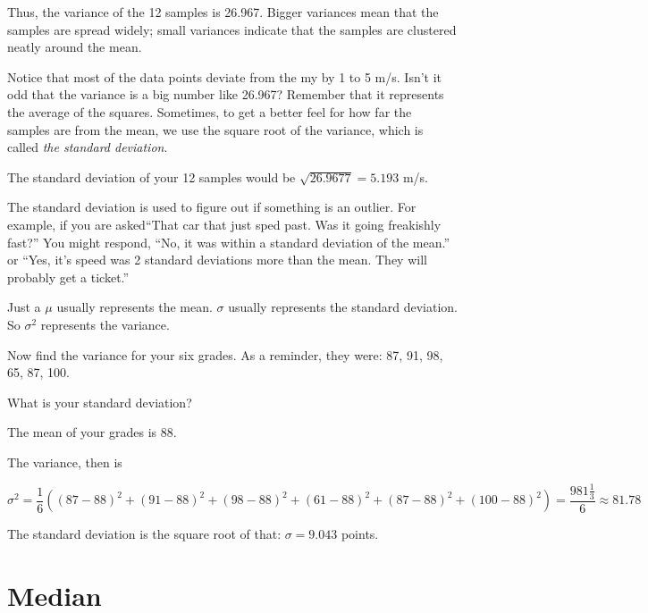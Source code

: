 Thus, the variance of the 12 samples is 26.967.  Bigger variances mean
that the samples are spread widely; small variances indicate that the
samples are clustered neatly around the mean.

Notice that most of the data points deviate from the my by 1 to 5
m/s. Isn't it odd that the variance is a big number like 26.967?
Remember that it represents the average of the squares. Sometimes, to
get a better feel for how far the samples are from the mean, we use
the square root of the variance, which is called \textit{the standard
  deviation}.

The standard deviation of your 12 samples would be $\sqrt{26.9677} =
  5.193$ m/s.

The standard deviation is used to figure out if something is an
outlier. For example, if you are asked``That car that just sped
past. Was it going freakishly fast?'' You might respond, ``No, it was
within a standard deviation of the mean.'' or ``Yes, it's speed was 2
standard deviations more than the mean. They will probably get a ticket.''

Just a $\mu$ usually represents the mean. $\sigma$ usually represents
the standard deviation.  So $\sigma^2$ represents the variance.

\begin{Exercise}[title={Variance of Grades}, label=grades_variance]

  Now find the variance for your six grades.  As a reminder, they were: 87, 91, 98, 65, 87, 100.

  What is your standard deviation?

\end{Exercise}
\begin{Answer}[ref=grades_variance]

  The mean of your grades is $88$.

  The variance, then is

  $$\sigma^2 = \frac{1}{6} \left((87 - 88)^2 + (91 - 88)^2 + (98 - 88)^2 + (61 - 88)^2 + (87 - 88)^2 + (100 - 88)^2 \right) = \frac{981 \frac{1}{3}}{6} \approx 81.78$$

  The standard deviation is the square root of that: $\sigma = 9.043$ points.
  
\end{Answer}


\section{Median}

